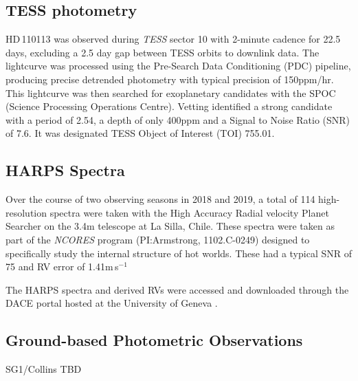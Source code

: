 \documentclass[fleqn,usenatbib]{mnras}
\newcommand{\tess}{{\it TESS}}
\newcommand{\ms}{m\,s$^{-1}$}
\newcommand{\Tstar}{HD\,110113}
\begin{document}
\subsection{TESS photometry}
\Tstar{} was observed during \tess{} sector 10 with 2-minute cadence for 22.5 days, excluding a 2.5 day gap between TESS orbits to downlink data.
The lightcurve was processed using the Pre-Search Data Conditioning (PDC) pipeline, producing precise detrended photometry with typical precision of 150ppm/hr.
This lightcurve was then searched for exoplanetary candidates with the SPOC (Science Processing Operations Centre).
Vetting identified a strong candidate with a period of 2.54, a depth of only 400ppm and a Signal to Noise Ratio (SNR) of 7.6.
It was designated TESS Object of Interest (TOI) 755.01. 

\subsection{HARPS Spectra}
Over the course of two observing seasons in 2018 and 2019, a total of 114 high-resolution spectra were taken with the High Accuracy Radial velocity Planet Searcher on the 3.4m telescope at La Silla, Chile.
These spectra were taken as part of the \textit{NCORES} program (PI:Armstrong, 1102.C-0249) designed to specifically study the internal structure of hot worlds.
These had a typical SNR of 75 and RV error of 1.41\ms{}

The HARPS spectra and derived RVs were accessed and downloaded through the DACE portal hosted at the University of Geneva \citep{2015ASPC..495....7B}.

\subsection{Ground-based Photometric Observations}
SG1/Collins TBD
\end{document}
